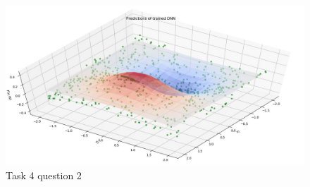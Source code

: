 \documentclass[12pt]{scrartcl}
\begin{document}
\begin{figure}[ht!]
	\hfill\includegraphics[width=\linewidth]{DNN_predictions.jpg}\hspace*{\fill}
	\caption{Task 4 question 2}
\end{figure}
\end{document}
